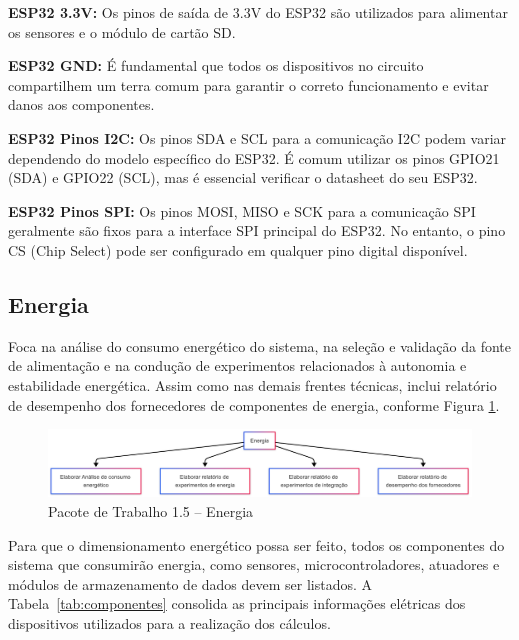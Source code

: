 \textbf{ESP32 3.3V:} Os pinos de saída de 3.3V do ESP32 são utilizados para alimentar os sensores e o módulo de cartão SD.

\textbf{ESP32 GND:} É fundamental que todos os dispositivos no circuito compartilhem um terra comum para garantir o correto funcionamento e evitar danos aos componentes.

\textbf{ESP32 Pinos I2C:} Os pinos SDA e SCL para a comunicação I2C podem variar dependendo do modelo específico do ESP32. É comum utilizar os pinos GPIO21 (SDA) e GPIO22 (SCL), mas é essencial verificar o datasheet do seu ESP32.

\textbf{ESP32 Pinos SPI:} Os pinos MOSI, MISO e SCK para a comunicação SPI geralmente são fixos para a interface SPI principal do ESP32. No entanto, o pino CS (Chip Select) pode ser configurado em qualquer pino digital disponível.


\subsection{Energia}

Foca na análise do consumo energético do sistema, na seleção e validação da fonte de alimentação e na condução de experimentos relacionados à autonomia e estabilidade energética. Assim como nas demais frentes técnicas, inclui relatório de desempenho dos fornecedores de componentes de energia, conforme Figura \ref{fig_eap_energia}.

\begin{figure}[!h]
	\centering
\includegraphics[width=15cm]{figuras/eap_energia.png}
	\caption{Pacote de Trabalho 1.5 – Energia}
	\label{fig_eap_energia} 
\end{figure}


Para que o dimensionamento energético possa ser feito, todos os componentes do sistema que consumirão energia, como sensores, microcontroladores, atuadores e módulos de armazenamento de dados devem ser listados. A Tabela~\ref{tab:componentes} consolida as principais informações elétricas dos dispositivos utilizados para a realização dos cálculos.

